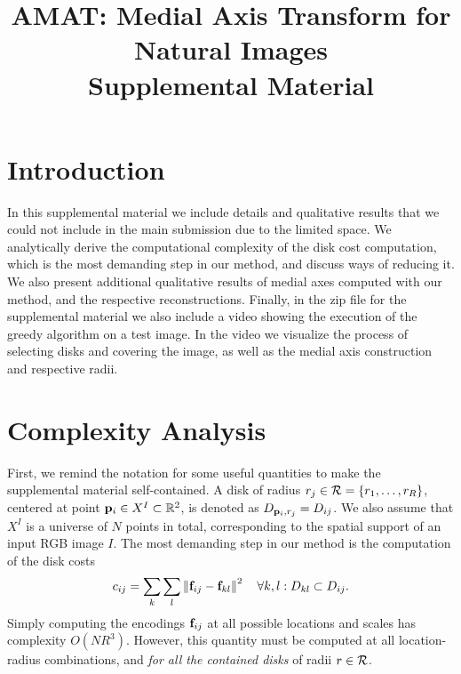 \documentclass[10pt,twocolumn,letterpaper]{article}
\begin{document}
\title{AMAT: Medial Axis Transform for Natural Images \\ Supplemental Material}
\maketitle

\section{Introduction}\label{sec:introduction}
In this supplemental material we include details and qualitative results that we could not include in the main submission due to the limited space.
We analytically derive the computational complexity of the disk cost computation, which is the most demanding step in our method, 
and discuss ways of reducing it.
We also present additional qualitative results of medial axes computed with our method, and the respective reconstructions.
Finally, in the zip file for the supplemental material we also include a video showing the execution of the greedy algorithm on a test image.
In the video we visualize the process of selecting disks and covering the image, as well as the medial axis construction and respective radii.

\section{Complexity Analysis}\label{sec:complexity}
First, we remind the notation for some useful quantities to make the supplemental material self-contained.
A disk of radius $r_j\in \mathcal{R} = \{r_1,\ldots,r_R\}$, 
centered at point $\mathbf{p}_{i}\in X^I \subset \mathbb{R}^2$, is denoted as $D_{\mathbf{p}_{i},r_j} = D_{ij}$.
We also assume that $X^I$ is a universe of $N$ points in total, corresponding to the spatial support of an input RGB image $I$.
The most demanding step in our method is the computation of the disk costs
\begin{equation}
c_{ij} = \sum_k \sum_l \left \lVert \mathbf{f}_{ij} - \mathbf{f}_{kl}  \right \rVert^2 \quad \forall k,l: D_{kl} \subset D_{ij}.
\label{eq:diskcost}
\end{equation}
Simply computing the encodings $\mathbf{f}_{ij}$ at all possible locations and scales has complexity $O(NR^3)$.
However, this quantity must be computed at all location-radius combinations, and \emph{for all the contained disks} of radii $r\in\mathcal{R}$.
\end{document}
